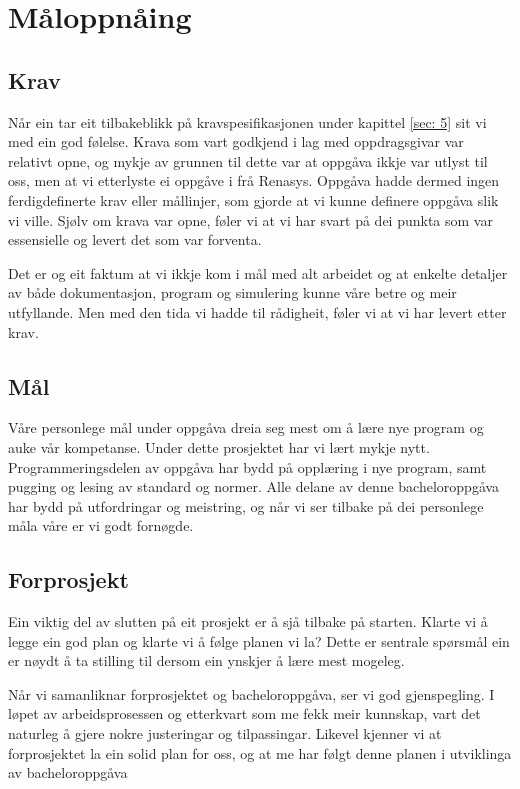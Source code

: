\section{Måloppnåing}
\thispagestyle{fancy}

\subsection{Krav}
Når ein tar eit tilbakeblikk på kravspesifikasjonen under kapittel \ref{sec: 5} sit vi med ein god følelse.
Krava som vart godkjend i lag med oppdragsgivar var relativt opne, og 
mykje av grunnen til dette var at oppgåva ikkje var utlyst til oss, men at vi etterlyste ei oppgåve i frå \gls{Renasys}.
Oppgåva hadde dermed ingen ferdigdefinerte krav eller mållinjer, som gjorde at vi kunne definere oppgåva slik vi ville.
Sjølv om krava var opne, føler vi at vi har svart på dei punkta som var essensielle og levert det som var forventa.

Det er og eit faktum at vi ikkje kom i mål med alt arbeidet og at enkelte detaljer av både dokumentasjon, program og simulering
kunne våre betre og meir utfyllande. Men med den tida vi hadde til rådigheit, føler vi at vi har levert etter krav.

\subsection{Mål}
Våre personlege mål under oppgåva dreia seg mest om å lære nye program og auke vår kompetanse. Under dette prosjektet har vi lært mykje nytt. 
Programmeringsdelen av oppgåva har bydd på opplæring i nye program, samt pugging og lesing av standard og normer.
Alle delane av denne bacheloroppgåva har bydd på utfordringar og meistring, og når vi ser tilbake på dei personlege måla våre er vi godt fornøgde.

\subsection{Forprosjekt}
Ein viktig del av slutten på eit prosjekt er å sjå tilbake på starten.
Klarte vi å legge ein god plan og klarte vi å følge planen vi la?
Dette er sentrale spørsmål ein er nøydt å ta stilling til dersom ein ynskjer å lære mest mogeleg.

Når vi samanliknar forprosjektet og bacheloroppgåva, ser vi god gjenspegling. 
I løpet av arbeidsprosessen og etterkvart som me fekk meir kunnskap, vart det naturleg å gjere nokre justeringar og tilpassingar. 
Likevel kjenner vi at forprosjektet la ein solid plan for oss, og at me har følgt denne planen i utviklinga av bacheloroppgåva



\newpage